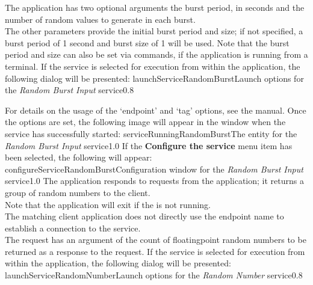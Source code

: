 The application has two optional arguments \longDash{} the burst period, in seconds and
the number of random values to generate in each burst.
\insertAppParameters
{}
\insertInputServiceComment\\

The other parameters provide the initial burst period and size; if not specified, a burst
period of 1 second and burst size of 1 will be used.
Note that the burst period and size can also be set via commands, if the application is
running from a terminal.
\condPage
\insertStandardServiceCommands{}
If the service is selected for execution from within the \emph{\MMMU} application, the
following dialog will be presented:
%
{launchServiceRandomBurst}{Launch options for the \emph{Random Burst Input} service}{0.8}

For details on the usage of the `endpoint' and `tag' options, see the \emph{\MMMU} manual.
Once the options are set, the following image will appear in the \emph{\MMMU} window when
the service has successfully started:
%
{serviceRunningRandomBurst}{The \emph{\MMMU} entity for the \emph{Random Burst Input}
service}{1.0}
\condPage{}
If the \textbf{Configure the service} menu item has been selected, the following will
appear:
%
{configureServiceRandomBurst}{Configuration window for the \emph{Random Burst Input}
service}{1.0}
\condPage
{}
The  application responds to
 requests from the
 application; it returns a group of random
numbers to the client.\\

Note that the application will exit if the  is not
running.\\

\insertAutoAppParameters
{}
The matching client application does not directly use the endpoint name to establish a
connection to the service.\\

The  request has an argument of the
count of floating\longDash{}point random numbers to be returned as a response to the
request.
%
\condPage
If the service is selected for execution from within the \emph{\MMMU} application, the
following dialog will be presented:
%
{launchServiceRandomNumber}{Launch options for the \emph{Random Number} service}{0.8}

